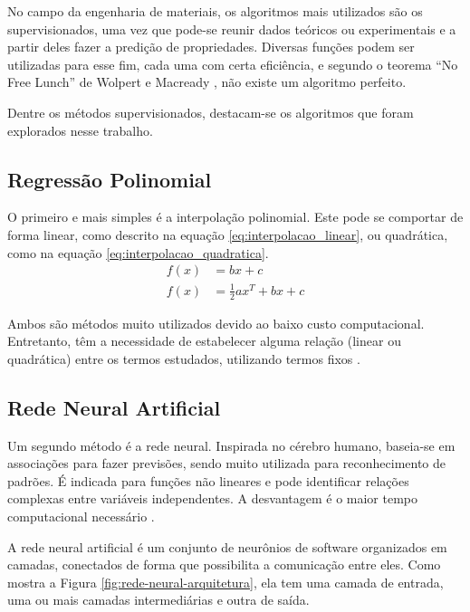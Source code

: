 \documentclass[brazil,tf,epusp]{usp}  %
\begin{document}
No campo da engenharia de materiais, os algoritmos mais utilizados são os supervisionados, uma vez que pode-se reunir dados teóricos ou experimentais e a partir deles fazer a predição de propriedades. Diversas funções podem ser utilizadas para esse fim, cada uma com certa eficiência, e segundo o teorema ``No Free Lunch'' de Wolpert e Macready  , não existe um algoritmo perfeito.

Dentre os métodos supervisionados, destacam-se os algoritmos que foram explorados nesse trabalho.

\subsection{Regressão Polinomial}
O primeiro e mais simples é a interpolação polinomial. Este pode se comportar de forma linear, como descrito na equação \ref{eq:interpolacao_linear}, ou quadrática, como na equação \ref{eq:interpolacao_quadratica}.
\begin{align}
  f(x) &= b x + c \label{eq:interpolacao_linear} \\
  f(x) &= \frac{1}{2} a x^T + b x + c \label{eq:interpolacao_quadratica}
\end{align}

Ambos são métodos muito utilizados devido ao baixo custo computacional. Entretanto, têm a necessidade de estabelecer alguma relação (linear ou quadrática) entre os termos estudados, utilizando termos fixos \cite{Bhadeshia1999}.

\subsection{Rede Neural Artificial}
Um segundo método é a rede neural. Inspirada no cérebro humano, baseia-se em associações para fazer previsões, sendo muito utilizada para reconhecimento de padrões. É indicada para funções não lineares e pode identificar relações complexas entre variáveis independentes. A desvantagem é o maior tempo computacional necessário \cite{Belisle2015}.

A rede neural artificial é um conjunto de neurônios de software organizados em camadas, conectados de forma que possibilita a comunicação entre eles. Como mostra a Figura \ref{fig:rede-neural-arquitetura}, ela tem uma camada de entrada, uma ou mais camadas intermediárias e outra de saída.
\end{document}
